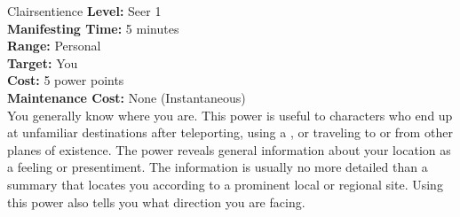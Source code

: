 {Clairsentience}
{
	\textbf{Level:}
	Seer 1\\
	\textbf{Manifesting Time:}
	5 minutes\\
	\textbf{Range:}
	Personal\\
	\textbf{Target:}
	You\\
	\textbf{Cost:}
	5 power points\\
	\textbf{Maintenance Cost:}
	None (Instantaneous)\\
}
{
	You generally know where you are. This power is useful to characters who end up at unfamiliar destinations after teleporting, using a , or traveling to or from other planes of existence. The power reveals general information about your location as a feeling or presentiment. The information is usually no more detailed than a summary that locates you according to a prominent local or regional site. Using this power also tells you what direction you are facing.
}